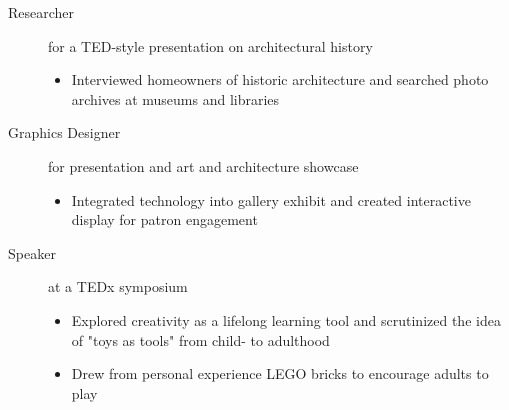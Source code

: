 \documentclass[a4paper]{deedy-resume} %
\begin{document}
    \sectionspace %

    \fi
    
    
    
    \begin{description}
    \item[Researcher] for a TED-style presentation on architectural history 
    
    \iftrue

    \begin{itemize}
        \item Interviewed homeowners of historic architecture and searched photo archives at museums and libraries
    \end{itemize}

    \fi

    \item[Graphics Designer] for presentation and art and architecture showcase
    
    \iftrue

    \begin{itemize}
        \item Integrated technology into gallery exhibit and created interactive display for patron engagement
    \end{itemize}

    \fi
    \end{description}
    
    \sectionspace %
    
    

    \begin{description}
        \item[Speaker] at a TEDx symposium
        \begin{itemize}
            \item Explored creativity as a lifelong learning tool and scrutinized the idea of "toys as tools" from child- to adulthood
            \item Drew from personal experience LEGO bricks to encourage adults to play
        \end{itemize}
    \end{description}
\end{document}
